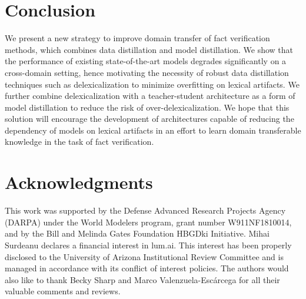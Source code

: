 \section{Conclusion}
We present a new strategy to improve domain transfer of fact verification methods, which combines data distillation and model distillation.  We show that the performance of existing state-of-the-art models degrades significantly on a cross-domain setting,
hence motivating the
necessity of robust data distillation techniques such as delexicalization to minimize overfitting on lexical artifacts.
We further combine delexicalization with a teacher-student architecture as a form of model distillation to reduce the risk of over-delexicalization. We hope that this solution will encourage the development of architectures capable of reducing the dependency of models on lexical artifacts in an effort to learn domain transferable knowledge in the task
of fact verification.


\section*{Acknowledgments}

This work was supported by the Defense Advanced Research Projects Agency (DARPA) under the World Modelers program, grant number
W911NF1810014, and by the Bill and Melinda Gates Foundation HBGDki Initiative. Mihai Surdeanu declares a financial interest in lum.ai. This interest has been properly disclosed to the University of Arizona Institutional Review Committee and is managed in accordance with its conflict of interest policies. The authors would also like to thank Becky Sharp and Marco Valenzuela-Escárcega for all their valuable comments and reviews.










